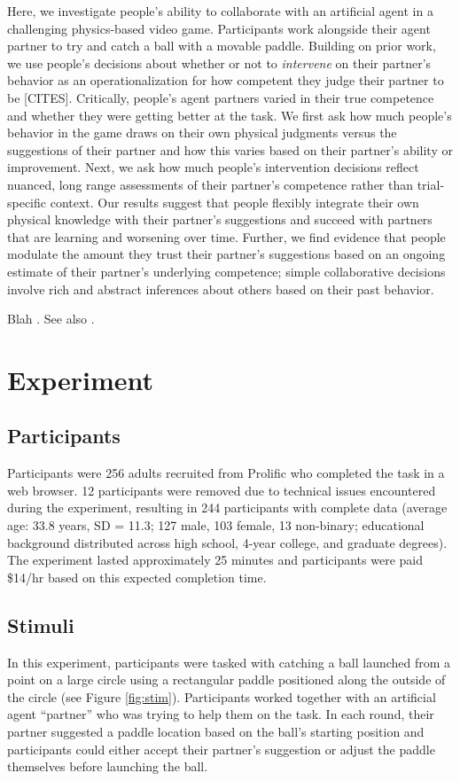 \documentclass[10pt,letterpaper]{article}
\begin{document}
Here, we investigate people's ability to collaborate with an artificial agent in a challenging physics-based video game. Participants work alongside their agent partner to try and catch a ball with a movable paddle. Building on prior work, we use people's decisions about whether or not to \textit{intervene} on their partner's behavior as an operationalization for how competent they judge their partner to be [CITES]. Critically, people's agent partners varied in their true competence and whether they were getting better at the task. We first ask how much people's behavior in the game draws on their own physical judgments versus the suggestions of their partner and how this varies based on their partner's ability or improvement. Next, we ask how much people's intervention decisions reflect nuanced, long range assessments of their partner's competence rather than trial-specific context. Our results suggest that people flexibly integrate their own physical knowledge with their partner's suggestions and succeed with partners that are learning and worsening over time. Further, we find evidence that people modulate the amount they trust their partner's suggestions based on an ongoing estimate of their partner's underlying competence; simple collaborative decisions involve rich and abstract inferences about others based on their past behavior.


Blah \cite{gweon2021inferential}.
See also .




\section{Experiment}

\subsection{Participants}

Participants were 256 adults recruited from Prolific who completed the task in a web browser. 12 participants were removed due to technical issues encountered during the experiment, resulting in 244 participants with complete data (average age: 33.8 years, SD = 11.3; 127 male, 103 female, 13 non-binary; educational background distributed across high school, 4-year college, and graduate degrees). The experiment lasted approximately 25 minutes and participants were paid \$14/hr based on this expected completion time. 


\subsection{Stimuli}
In this experiment, participants were tasked with catching a ball launched from a point on a large circle using a rectangular paddle positioned along the outside of the circle (see Figure \ref{fig:stim}).\footnotemark{} 
Participants worked together with an artificial agent ``partner'' who was trying to help them on the task. In each round, their partner suggested a paddle location based on the ball's starting position and participants could either accept their partner's suggestion or adjust the paddle themselves before launching the ball.  
\end{document}
